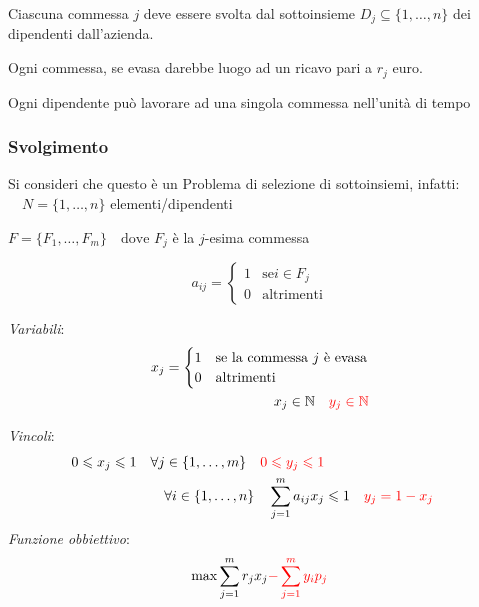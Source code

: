 Ciascuna commessa $j$ deve essere svolta dal sottoinsieme $D_j\subseteq\{1,\dots, n\}$ dei dipendenti dall'azienda. 

Ogni commessa, se evasa darebbe luogo ad un ricavo pari a $r_j$ euro.

Ogni dipendente può lavorare ad una singola commessa nell'unità di tempo 

\subsubsection{Svolgimento}
Si consideri che questo è un Problema di selezione di sottoinsiemi, infatti:
$\quad N=\{1,\dots,n\}$ elementi/dipendenti

$F = \{F_1, \dots, F_m\} \quad \text{dove } F_j$ è la $j$-esima commessa

\[
    a_{ij}= \begin{cases}
        1 & \text{se} i\in F_j\\
        0 & \text{altrimenti}
    \end{cases}
\]

\textit{Variabili}:
\[
    \begin{aligned}
        x_j= \begin{cases}
            1 & \text{se la commessa $j$ è evasa}\\
            0 & \text{altrimenti}
        \end{cases}\\
        x_j\in\mathbb{N} \quad \textcolor{red}{y_j\in\mathbb{N}}
    \end{aligned}
\]

\textit{Vincoli}:
\[
    \begin{aligned}
        0\leqslant x_j\leqslant 1 \quad \forall j\in\{1,\dots,m\} \quad \textcolor{red}{0\leqslant y_j\leqslant 1}\\
        \forall i\in\{1,\dots,n\}\quad \sum^m_{j=1}a_{ij}x_j &\leqslant 1 \quad \textcolor{red}{y_j=1-x_j}
    \end{aligned}
\]
\textit{Funzione obbiettivo}:
\[
    \max \sum^m_{j=1}r_jx_j \textcolor{red}{-\sum^m_{j=1}y_ip_j}
\]
